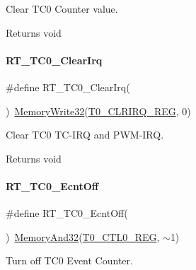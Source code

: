 Clear T\+C0 Counter value. 

\begin{DoxyReturn}{Returns}
void 
\end{DoxyReturn}
\mbox{\label{a00041_a8758649b0f3c3401f75970ddeab0a8d9}} 
\paragraph{\texorpdfstring{R\+T\+\_\+\+T\+C0\+\_\+\+Clear\+Irq}{RT\_TC0\_ClearIrq}}
{\footnotesize\ttfamily \#define R\+T\+\_\+\+T\+C0\+\_\+\+Clear\+Irq(\begin{DoxyParamCaption}{ }\end{DoxyParamCaption})~\mbox{\hyperlink{a00020_a6b9732365b12e48ddb89fe1028b975b0}{Memory\+Write32}}(\mbox{\hyperlink{a00020_adadaa0ab1ebbd7ba9b70dfd24c3ed44da605de2dfe6755d8f8fad197c5f407167}{T0\+\_\+\+C\+L\+R\+I\+R\+Q\+\_\+\+R\+EG}}, 0)}



Clear T\+C0 T\+C-\/\+I\+RQ and P\+W\+M-\/\+I\+RQ. 

\begin{DoxyReturn}{Returns}
void 
\end{DoxyReturn}
\mbox{\label{a00041_a2c4dcae7aa5753dc38986240b024888f}} 
\paragraph{\texorpdfstring{R\+T\+\_\+\+T\+C0\+\_\+\+Ecnt\+Off}{RT\_TC0\_EcntOff}}
{\footnotesize\ttfamily \#define R\+T\+\_\+\+T\+C0\+\_\+\+Ecnt\+Off(\begin{DoxyParamCaption}{ }\end{DoxyParamCaption})~\mbox{\hyperlink{a00020_ad87cedffcaadc51db22594fce55173d4}{Memory\+And32}}(\mbox{\hyperlink{a00020_adadaa0ab1ebbd7ba9b70dfd24c3ed44da869abf9d87f78f45a0e07ad352abb39e}{T0\+\_\+\+C\+T\+L0\+\_\+\+R\+EG}}, $\sim$1)}



Turn off T\+C0 Event Counter. 

